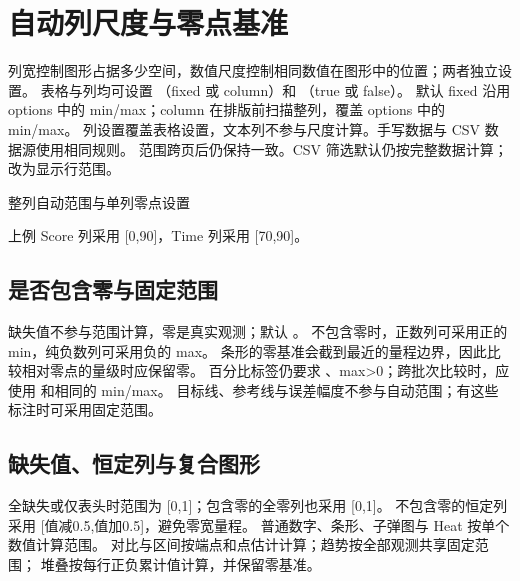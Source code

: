 \section{自动列尺度与零点基准}
\label{sec:column-scale}
列宽控制图形占据多少空间，数值尺度控制相同数值在图形中的位置；两者独立设置。
表格与列均可设置 （fixed 或 column）和 （true 或 false）。
默认 fixed 沿用 options 中的 min/max；column 在排版前扫描整列，覆盖 options 中的 min/max。
列设置覆盖表格设置，文本列不参与尺度计算。手写数据与 CSV 数据源使用相同规则。
范围跨页后仍保持一致。CSV 筛选默认仍按完整数据计算； 改为显示行范围。
\begin{example}[text and listing,sidebyside=false]{整列自动范围与单列零点设置}
\begin{center}
\begin{gradtable}[align=c,header align=c,width=\linewidth,scale=column,include zero=false]
\end{gradtable}
\end{center}
\end{example}
上例 Score 列采用 [0,90]，Time 列采用 [70,90]。
\subsection{是否包含零与固定范围}
缺失值不参与范围计算，零是真实观测；默认 。
不包含零时，正数列可采用正的 min，纯负数列可采用负的 max。
条形的零基准会截到最近的量程边界，因此比较相对零点的量级时应保留零。
百分比标签仍要求 、max>0；跨批次比较时，应使用  和相同的 min/max。
目标线、参考线与误差幅度不参与自动范围；有这些标注时可采用固定范围。
\subsection{缺失值、恒定列与复合图形}
全缺失或仅表头时范围为 [0,1]；包含零的全零列也采用 [0,1]。
不包含零的恒定列采用 [值减0.5,值加0.5]，避免零宽量程。
普通数字、条形、子弹图与 Heat 按单个数值计算范围。
对比与区间按端点和点估计计算；趋势按全部观测共享固定范围；
堆叠按每行正负累计值计算，并保留零基准。

